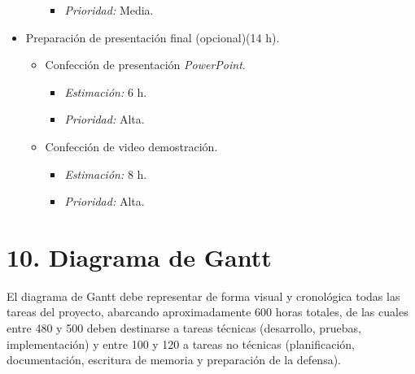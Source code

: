 \documentclass[
11pt, %
]{charter}
\begin{document}
\begin{itemize}
\begin{itemize}
\begin{itemize}
                    \item \textit{Prioridad:} Media.
                \end{itemize}
        \end{itemize} 
    \item Preparación de presentación final (opcional)(14 h).
        \begin{itemize}
            \item Confección de presentación \textit{PowerPoint}.
                \begin{itemize}
                    \item \textit{Estimación:} 6 h.
                    \item \textit{Prioridad:} Alta.
                \end{itemize}
            \item Confección de video demostración.
                \begin{itemize}
                    \item \textit{Estimación:} 8 h.
                    \item \textit{Prioridad:} Alta.
                \end{itemize}
        \end{itemize}
\end{itemize}

\section{10. Diagrama de Gantt}
\label{sec:gantt}

El diagrama de Gantt debe representar de forma visual y cronológica todas las tareas del proyecto, abarcando aproximadamente 600 horas totales, de las cuales entre 480 y 500 deben destinarse a tareas técnicas (desarrollo, pruebas, implementación) y entre 100 y 120 a tareas no técnicas (planificación, documentación, escritura de memoria y preparación de la defensa).
\end{document}
